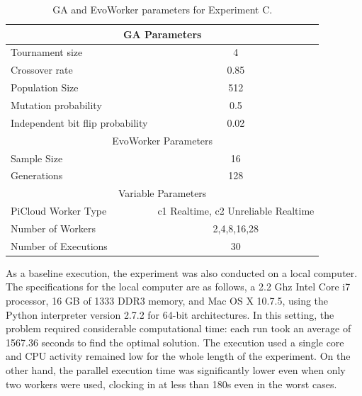 \begin{table}[t]
\renewcommand{\arraystretch}{1.3}
\caption{GA and EvoWorker parameters for Experiment C.}
\label{tab:paramse}
\centering
\begin{tabular}{|l||c|}
\hline
\multicolumn{2}{|c|}{GA Parameters} \\
\hline
Tournament size & 4 \\
Crossover rate & 0.85  \\
Population Size & 512 \\
Mutation probability & 0.5 \\
Independent bit flip probability  & 0.02 \\
\hline
\multicolumn{2}{|c|}{EvoWorker Parameters} \\
\hline
Sample Size & 16 \\
Generations & 128 \\
\hline
\multicolumn{2}{|c|}{Variable Parameters} \\
\hline
PiCloud Worker Type & c1 Realtime, c2 Unreliable Realtime \\
Number of Workers & 2,4,8,16,28 \\
Number of Executions & 30 \\
\hline

\end{tabular}
\end{table}

As a baseline execution, the experiment was also conducted on a local computer. The specifications for the local computer are as follows, a
2.2 Ghz Intel Core i7 processor, 16 GB of 1333 DDR3 memory, and Mac OS X 10.7.5,
using the Python interpreter version 2.7.2 for 64-bit architectures. 
In this setting, the problem required considerable computational time: each run took an average of 1567.36 seconds to find the optimal solution.
The execution used a single core and CPU activity remained low for the whole length of the experiment. On the other hand,
the parallel execution time was significantly lower even when only two workers were used, clocking in at less than 180s even in the worst cases.


